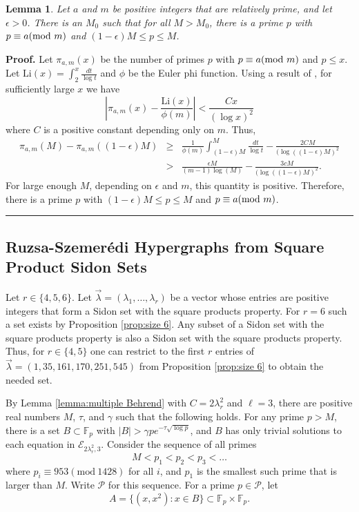 \documentclass[12pt]{article}%
\newtheorem{lemma}[theorem]{Lemma}
\newenvironment{proof}[1][Proof]{\noindent\textbf{#1.} }
{\hfill \ \rule{0.5em}{0.5em}}
\begin{document}
\begin{lemma}\label{lemma:PNT lemma}
Let $a$ and $m$ be positive integers that are relatively prime, and let $\epsilon >0$.  There is an $M_0$ such that for all $M > M_0$, there is a prime $p $ with $p \equiv a ( \textup{mod}~m)$ and 
$(1 - \epsilon) M \leq p \leq M$.   
  \end{lemma}
  \begin{proof}
Let $\pi_{a,m} (x)$ be the number of primes $p $ with $p \equiv a ( \textup{mod}~m)$ and $p \leq x$.  Let $\textrm{Li}(x) = \int_2^x \frac{dt}{ \log t}$ and $\phi$ be the Euler phi function.  Using a result of 
\cite{Bennett}, for sufficiently large $x$ we have
\[
\left| \pi_{a,m}(x)  - \frac{\textrm{Li}(x) }{ \phi (m) } \right| 
< \frac{ C x}{ ( \log x )^2}
\]
where $C$ is a positive constant depending only on $m$.  Thus,
\begin{eqnarray*} 
\pi_{ a , m }( M )  - \pi_{a , m}( ( 1 - \epsilon ) M) & \geq & 
\frac{1}{ \phi (m) } \int_{ ( 1 - \epsilon )M }^{M}  \frac{dt}{ \log t} 
- \frac{2CM}{ ( \log ( ( 1 - \epsilon ) M )^2  } \\ 
& > & 
\frac{ \epsilon M}{ (m - 1) \log ( M ) } - \frac{3 cM}{ ( \log ( ( 1 - \epsilon ) M )^2}.
\end{eqnarray*}
 For large enough $M$, depending on $\epsilon$ and $m$, this quantity is positive.  Therefore, 
 there is a prime $p$ with $( 1- \epsilon ) M \leq p \leq M$ and 
 $p \equiv a ( \textup{mod}~m)$.  
    \end{proof}
    \medskip



\subsection{Ruzsa-Szemer\'{e}di Hypergraphs from Square Product Sidon Sets}\label{sec:4.2}

Let $r \in \{4,5,6 \}$.  
Let $\vec{\lambda} = ( \lambda_1 , \dots , \lambda_r) $ 
be a vector whose entries are positive integers that 
form a Sidon set with the square products property.  For $r=6$ such a set exists by 
Proposition \ref{prop:size 6}.  
Any subset of a Sidon set with the square products property is also a Sidon set with the square products property.  Thus, for $r \in \{4,5 \}$ one can restrict to the first $r$ entries of 
$\vec{ \lambda} = ( 1,35,161,170,251,545)$ from Proposition \ref{prop:size 6} to obtain the needed set.  

By Lemma \ref{lemma:multiple Behrend} with $C= 2 \lambda_r^2$ and $\ell = 3$, there are positive real numbers $M$, $\tau$, and $\gamma$ such that the following holds.  For any prime $p > M$, there is a set $B \subset \mathbb{F}_p$ with 
$|B| > \gamma p e^{ - \tau \sqrt{ \log p } } $,
and $B$ has only trivial solutions to each 
equation in $\mathcal{E}_{ 2 \lambda_r^2 , 3}$.  
Consider the sequence of all primes 
\[
 M < p_1 < p_2 < p_3 < \dots 
\]
where $p_i \equiv 953 ( \textrm{mod}~1428)$ for all $i$, and $p_1$ is the smallest such prime that is larger than $M$.   
Write $\mathcal{P}$ for this sequence.  
For a prime $p \in \mathcal{P}$, let 
\[
A = \{ (x,x^2) : x \in B \} \subset \mathbb{F}_p \times \mathbb{F}_p.
\]
\end{document}
